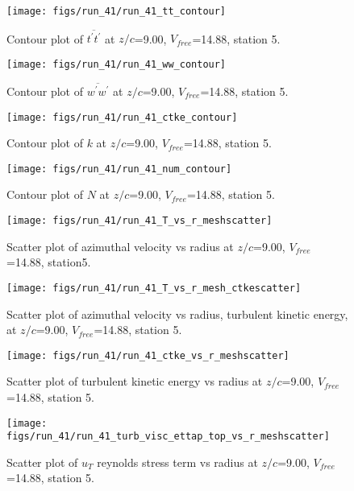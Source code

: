 \begin{figure}[H]
\centering
\texttt{[image: figs/run\_41/run\_41\_tt\_contour]}
\caption{Contour plot of $\overline{t^\prime t^\prime}$ at $z/c$=9.00, $V_{free}$=14.88, station 5.}
\end{figure}


\begin{figure}[H]
\centering
\texttt{[image: figs/run\_41/run\_41\_ww\_contour]}
\caption{Contour plot of $\overline{w^\prime w^\prime}$ at $z/c$=9.00, $V_{free}$=14.88, station 5.}
\end{figure}


\begin{figure}[H]
\centering
\texttt{[image: figs/run\_41/run\_41\_ctke\_contour]}
\caption{Contour plot of $k$ at $z/c$=9.00, $V_{free}$=14.88, station 5.}
\end{figure}


\begin{figure}[H]
\centering
\texttt{[image: figs/run\_41/run\_41\_num\_contour]}
\caption{Contour plot of $N$ at $z/c$=9.00, $V_{free}$=14.88, station 5.}
\end{figure}


\begin{figure}[H]
\centering
\texttt{[image: figs/run\_41/run\_41\_T\_vs\_r\_meshscatter]}
\caption{Scatter plot of azimuthal velocity vs radius at $z/c$=9.00, $V_{free}$=14.88, station5.}
\end{figure}


\begin{figure}[H]
\centering
\texttt{[image: figs/run\_41/run\_41\_T\_vs\_r\_mesh\_ctkescatter]}
\caption{Scatter plot of azimuthal velocity vs radius, turbulent kinetic energy, at $z/c$=9.00, $V_{free}$=14.88, station 5.}
\end{figure}


\begin{figure}[H]
\centering
\texttt{[image: figs/run\_41/run\_41\_ctke\_vs\_r\_meshscatter]}
\caption{Scatter plot of turbulent kinetic energy vs radius at $z/c$=9.00, $V_{free}$=14.88, station 5.}
\end{figure}


\begin{figure}[H]
\centering
\texttt{[image: figs/run\_41/run\_41\_turb\_visc\_ettap\_top\_vs\_r\_meshscatter]}
\caption{Scatter plot of $
u_T$ reynolds stress term vs radius at $z/c$=9.00, $V_{free}$=14.88, station 5.}
\end{figure}



